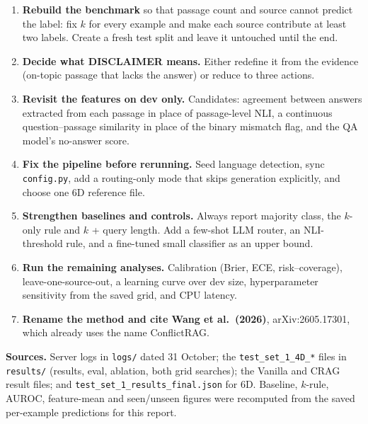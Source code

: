 \documentclass[10pt,a4paper]{article}
\newcommand{\code}[1]{\texttt{\small #1}}
\begin{document}
\begin{enumerate}
\item \textbf{Rebuild the benchmark} so that passage count and source cannot predict the label:
  fix $k$ for every example and make each source contribute at least two labels. Create a fresh
  test split and leave it untouched until the end.
\item \textbf{Decide what DISCLAIMER means.} Either redefine it from the evidence (on-topic passage
  that lacks the answer) or reduce to three actions.
\item \textbf{Revisit the features on dev only.} Candidates: agreement between answers extracted
  from each passage in place of passage-level NLI, a continuous question--passage similarity in
  place of the binary mismatch flag, and the QA model's no-answer score.
\item \textbf{Fix the pipeline before rerunning.} Seed language detection, sync \code{config.py},
  add a routing-only mode that skips generation explicitly, and choose one 6D reference file.
\item \textbf{Strengthen baselines and controls.} Always report majority class, the $k$-only rule
  and $k$ + query length. Add a few-shot LLM router, an NLI-threshold rule, and a fine-tuned
  small classifier as an upper bound.
\item \textbf{Run the remaining analyses.} Calibration (Brier, ECE, risk--coverage),
  leave-one-source-out, a learning curve over dev size, hyperparameter sensitivity from the saved
  grid, and CPU latency.
\item \textbf{Rename the method and cite Wang et al.\ (2026)}, arXiv:2605.17301, which already
  uses the name ConflictRAG.
\end{enumerate}

{\small\textbf{Sources.} Server logs in \code{logs/} dated 31 October; the \code{test\_set\_1\_4D\_*}
files in \code{results/} (results, eval, ablation, both grid searches); the Vanilla and CRAG
result files; and \code{test\_set\_1\_results\_final.json} for 6D. Baseline, $k$-rule, AUROC,
feature-mean and seen/unseen figures were recomputed from the saved per-example predictions for
this report.}
\end{document}
